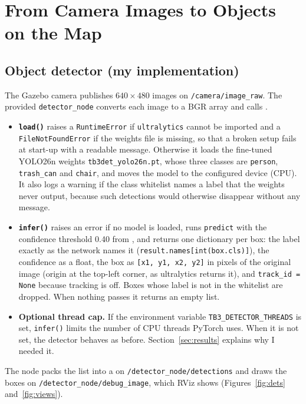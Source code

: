 \documentclass[11pt]{article}
\begin{document}
\section{From Camera Images to Objects on the Map}
\label{sec:perception}

\subsection{Object detector (my implementation)}

The Gazebo camera publishes $640\times480$ images on \texttt{/camera/image\_raw}. The provided \texttt{detector\_node} converts each image to a BGR array and calls .

\begin{itemize}[leftmargin=1.2em]
\item \textbf{\texttt{load()}} raises a \texttt{RuntimeError} if \texttt{ultralytics} cannot be imported and a \texttt{FileNotFoundError} if the weights file is missing, so that a broken setup fails at start-up with a readable message. Otherwise it loads the fine-tuned YOLO26n weights \texttt{tb3det\_yolo26n.pt}, whose three classes are \texttt{person}, \texttt{trash\_can} and \texttt{chair}, and moves the model to the configured device (CPU). It also logs a warning if the class whitelist names a label that the weights never output, because such detections would otherwise disappear without any message.
\item \textbf{\texttt{infer()}} raises an error if no model is loaded, runs \texttt{predict} with the confidence threshold 0.40 from , and returns one dictionary per box: the label exactly as the network names it (\texttt{result.names[int(box.cls)]}), the confidence as a float, the box as \texttt{[x1, y1, x2, y2]} in pixels of the original image (origin at the top-left corner, as ultralytics returns it), and \texttt{track\_id = None} because tracking is off. Boxes whose label is not in the whitelist are dropped. When nothing passes it returns an empty list.
\item \textbf{Optional thread cap.} If the environment variable \texttt{TB3\_DETECTOR\_THREADS} is set, \texttt{infer()} limits the number of CPU threads PyTorch uses. When it is not set, the detector behaves as before. Section~\ref{sec:results} explains why I needed it.
\end{itemize}

The node packs the list into a  on \texttt{/detector\_node/detections} and draws the boxes on \texttt{/detector\_node/debug\_image}, which RViz shows (Figures~\ref{fig:dets} and~\ref{fig:views}).
\end{document}
